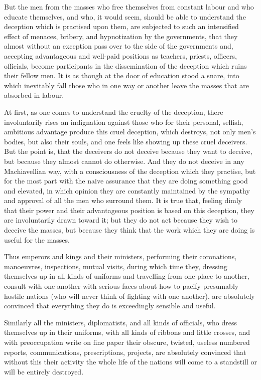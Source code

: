 \documentclass{book}
\begin{document}
But the men from the masses who free themselves from constant labour and who educate themselves, and who, it would seem, should be able to understand the deception which is practised upon them, are subjected to such an intensified effect of menaces, bribery, and hypnotization by the governments, that they almost without an exception pass over to the side of the governments and, accepting advantageous and well-paid positions as teachers, priests, officers, officials, become participants in the dissemination of the deception which ruins their fellow men. It is as though at the door of education stood a snare, into which inevitably fall those who in one way or another leave the masses that are absorbed in labour.

At first, as one comes to understand the cruelty of the deception, there involuntarily rises an indignation against those who for their personal, selfish, ambitious advantage produce this cruel deception, which destroys, not only men’s bodies, but also their souls, and one feels like showing up these cruel deceivers. But the point is, that the deceivers do not deceive because they want to deceive, but because they almost cannot do otherwise. And they do not deceive in any Machiavellian way, with a consciousness of the deception which they practise, but for the most part with the naive assurance that they are doing something good and elevated, in which opinion they are constantly maintained by the sympathy and approval of all the men who surround them. It is true that, feeling dimly that their power and their advantageous position is based on this deception, they are involuntarily drawn toward it; but they do not act because they wish to deceive the masses, but because they think that the work which they are doing is useful for the masses.

Thus emperors and kings and their ministers, performing their coronations, manoeuvres, inspections, mutual visits, during which time they, dressing themselves up in all kinds of uniforms and travelling from one place to another, consult with one another with serious faces about how to pacify presumably hostile nations (who will never think of fighting with one another), are absolutely convinced that everything they do is exceedingly sensible and useful.

Similarly all the ministers, diplomatists, and all kinds of officials, who dress themselves up in their uniforms, with all kinds of ribbons and little crosses, and with preoccupation write on fine paper their obscure, twisted, useless numbered reports, communications, prescriptions, projects, are absolutely convinced that without this their activity the whole life of the nations will come to a standstill or will be entirely destroyed.
\end{document}
